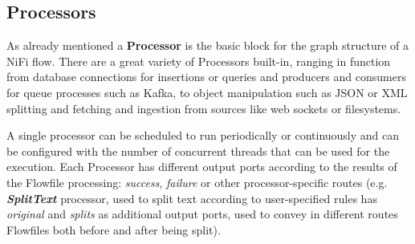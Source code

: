 \subsection{Processors}

As already mentioned a \textbf{Processor} is the basic block for the graph structure of a NiFi flow. There are a great variety of Processors built-in, ranging in function from database connections for insertions or queries and producers and consumers for queue processes such as Kafka, to object manipulation such as JSON or XML splitting and fetching and ingestion from sources like web sockets or filesystems.

A single processor can be scheduled to run periodically or continuously and can be configured with the number of concurrent threads that can be used for the execution. Each Processor has different output ports according to the results of the Flowfile processing: \textit{success}, \textit{failure} or other processor-specific routes (e.g. \textit{\textbf{SplitText}} processor, used to split text according to user-specified rules has \textit{original} and \textit{splits} as additional output ports, used to convey in different routes Flowfiles both before and after being split).